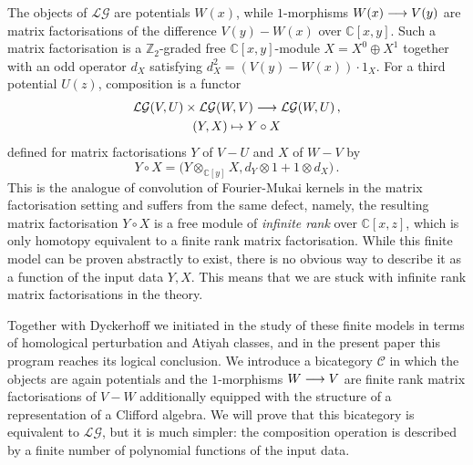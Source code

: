 \documentclass[english,letter paper,12pt,leqno]{article}
\theoremstyle{example}
\numberwithin{equation}{section}
\def\LG{\mathcal{LG}}
\def\be{\begin{equation}}
\def\ee{\end{equation}}
\def\nZ{\mathds{Z}}
\def\nC{\mathds{C}}
\def\L{\mathcal{C}}
\begin{document}
The objects of $\LG$ are potentials $W(x)$, while $1$-morphisms $W(x) \longrightarrow V(y)$ are matrix factorisations of the difference $V(y) - W(x)$ over $\nC[x,y]$. Such a matrix factorisation is a $\nZ_2$-graded free $\nC[x,y]$-module $X = X^0 \oplus X^1$ together with an odd operator $d_X$ satisfying $d_X^2 = (V(y) - W(x)) \cdot 1_X$. For a third potential $U(z)$, composition is a functor
\begin{gather*}
\LG(V,U) \times \LG(W,V) \lto \LG(W,U)\,,\\
(Y , X) \mapsto Y \circ X
\end{gather*}
defined for matrix factorisations $Y$ of $V - U$ and $X$ of $W - V$ by
\be
Y \circ X = \big( Y \otimes_{\nC[y]} X, d_Y \otimes 1 + 1 \otimes d_X \big)\,.
\ee
This is the analogue of convolution of Fourier-Mukai kernels in the matrix factorisation setting and suffers from the same defect, namely, the resulting matrix factorisation $Y \circ X$ is a free module of \emph{infinite rank} over $\nC[x,z]$, which is only homotopy equivalent to a finite rank matrix factorisation. While this finite model can be proven abstractly to exist, there is no obvious way to describe it as a function of the input data $Y,X$. This means that we are stuck with infinite rank matrix factorisations in the theory.

Together with Dyckerhoff we initiated in \cite{dm1102.2957} the study of these finite models in terms of homological perturbation and Atiyah classes, and in the present paper this program reaches its logical conclusion. We introduce a bicategory $\L$ in which the objects are again potentials and the $1$-morphisms $W \longrightarrow V$ are finite rank matrix factorisations of $V - W$ additionally equipped with the structure of a representation of a Clifford algebra. We will prove that this bicategory is equivalent to $\LG$, but it is much simpler: the composition operation is described by a finite number of polynomial functions of the input data.
\end{document}
